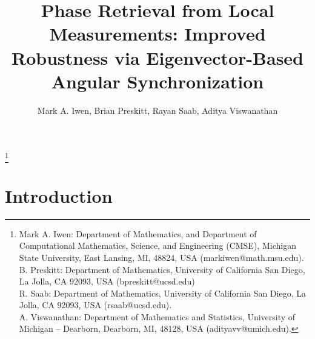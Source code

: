 \documentclass[11pt]{amsart}
\newcommand{\RSnote}[1]{\textcolor{blue}{[{\em {\bf **RS Note:} #1}]}}
\begin{document}
\pagestyle{plain}


\title{Phase Retrieval from Local Measurements:  Improved Robustness via Eigenvector-Based Angular
Synchronization}\thanks{Mark A. Iwen:  Department of Mathematics, and Department of Computational
Mathematics, Science, and Engineering (CMSE), Michigan State University, East Lansing, MI, 48824,
USA (markiwen@math.msu.edu).   \\ \indent B. Preskitt:  Department of Mathematics, University of
California San Diego, La Jolla, CA 92093, USA (bpreskitt@ucsd.edu)\\ \indent  R. Saab:  Department
of Mathematics, University of California San Diego, La Jolla, CA 92093, USA (rsaab@ucsd.edu).   \\
\indent A. Viswanathan:  Department of Mathematics and Statistics, University of Michigan --
Dearborn, Dearborn, MI, 48128, USA (adityavv@umich.edu).}
\author{Mark A. Iwen, Brian Preskitt, Rayan Saab, Aditya Viswanathan}


\begin{abstract}%

\end{abstract}

\maketitle
\thispagestyle{empty}

\section{Introduction}
\label{sec:intro}


\end{document}
